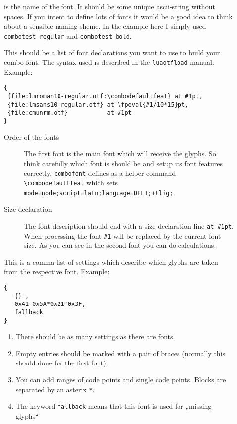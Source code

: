 \documentclass[parskip=half-,egregdoesnotlikesansseriftitles]{scrartcl}
\newcommand\package[1]{\texttt{#1}}
\begin{document}
\begin{description}
  \item[] is the name of the font. It should be some unique ascii-string without spaces. If you intent to define lots of fonts it would be a good idea to think about a sensible naming sheme. In the example here I simply used \texttt{combotest-regular} and \texttt{combotest-bold}.
      
  \item[] This should be a list of font declarations you want to use to build your combo font. The syntax used is described in the \package{luaotfload} manual. Example:
      
\begin{verbatim}
{
 {file:lmroman10-regular.otf:\combodefaultfeat} at #1pt,
 {file:lmsans10-regular.otf} at \fpeval{#1/10*15}pt,
 {file:cmunrm.otf}           at #1pt
}
\end{verbatim}

\begin{description}
\item[Order of the fonts] The first font is the main font which will receive the glyphs. So think carefully which font is should be and setup its font features correctly. \package{combofont} defines as a helper command \verb+\combodefaultfeat+ which sets \texttt{mode=node;script=latn;language=DFLT;+tlig;}. 
    
\item[Size declaration] The font description should end with a size declaration line \verb+at #1pt+. When processing the font \verb+#1+ will be replaced by the current font size. As you can see in the second font you can do calculations.
\end{description}

\item[] This is a comma list of settings which describe which glyphs are taken from the respective font. Example:

\begin{verbatim}
{
   {} ,
   0x41-0x5A*0x21*0x3F,
   fallback
}
\end{verbatim}

\begin{enumerate}
\item There should be as many settings as there are fonts.
\item Empty entries should be marked with a pair of braces (normally this should done for the first font).
\item You can add ranges of code points and single code points. Blocks are separated by an asterix \verb+*+. 
\item The keyword \texttt{fallback} means that this font is used for „missing glyphs“  
\end{enumerate}  
\end{description}
\end{document}
